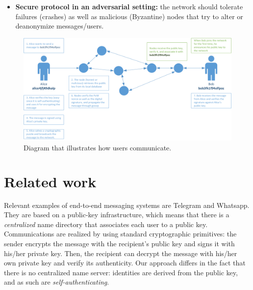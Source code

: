\documentclass[a4paper,12pt]{article}
\begin{document}
\begin{itemize}
	\item \textbf{Secure protocol in an adversarial setting:} the network should tolerate failures (crashes) as well as malicious (Byzantine) nodes that try to alter or deanonymize messages/users.
\end{itemize}

\begin{figure}[H]
	\centering{}
	\includegraphics[width=\textwidth]{img/figure.png}
	\caption{Diagram that illustrates how users communicate.}
	\label{fig:figure}
\end{figure}

\section{Related work} %
Relevant examples of end-to-end messaging systems are Telegram and Whatsapp. They are based on a public-key infrastructure, which means that there is a \emph{centralized} name directory that associates each user to a public key. Communications are realized by using standard cryptographic primitives: the sender encrypts the message with the recipient's public key and signs it with his/her private key. Then, the recipient can decrypt the message with his/her own private key and verify its authenticity. Our approach differs in the fact that there is no centralized name server: identities are derived from the public key, and as such are \emph{self-authenticating}.
\end{document}
